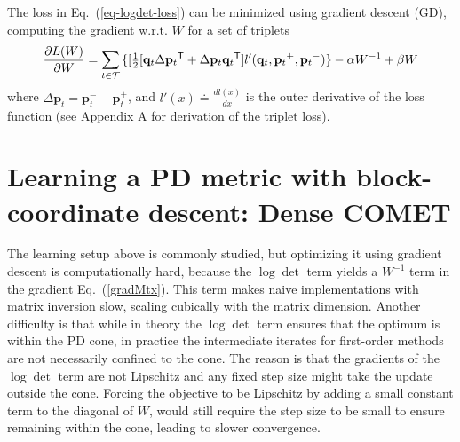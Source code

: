\documentclass[twoside,11pt]{article}
\newcommand\mat[1]{{#1}}
\renewcommand\vec[1]{\mathbf{#1}}
\newcommand{\T}{{}^\mathsf{T}}
\newcommand{\W}{\mat{W}}
\newcommand{\eqdef}{\doteq}
\newcommand{\q}{{\vec{q}}}
\newcommand{\p}{{\vec{p}}}
\newcommand{\trip}{{t}}
\newcommand{\qt}{{\q_{\trip}}}
\newcommand{\pt}{{\p_{\trip}}}
\newcommand{\triplet}{(\qt, \pt^{+}, \pt^{-})}
\renewcommand{\eqref}[1]{Eq.~(\ref{#1})}
\begin{document}
The loss in \eqref{eq-logdet-loss} can be minimized using gradient descent (GD), computing the gradient w.r.t. $\W$ for a set of triplets
\begin{equation}
  \frac{\partial {L (\W)}}{\partial \W} = \sum\limits_{t\in \cal{T}}{\{
  [\tfrac{1}{2}[\q_{t}\Delta\p_{t}\T + \Delta\p_{t}\q_{t}\T]  }
  {l'}\triplet\} - \alpha \W^{-1} + \beta \W
  \label{gradMtx}
\end{equation}
where $\Delta\p_t = \p_t^- - \p_t^+$, and $l'(x) \eqdef \frac{d{l(x)}}{dx}$ is the outer derivative of the loss function (see Appendix A for derivation of the triplet loss). 
\section{Learning a PD metric with block-coordinate descent: Dense COMET}
\label{learing_dense_comet}
\vskip -5pt
The learning setup above is commonly studied, but 
optimizing it using gradient descent is computationally hard, because the $\log \det$ term yields a $\W^{-1}$ term in the gradient \eqref{gradMtx}. This term makes naive implementations with matrix inversion slow, scaling cubically with the matrix dimension. Another difficulty is that while in theory the $\log \det$ term ensures that the optimum is within the PD cone, in practice the intermediate iterates for first-order methods are not necessarily confined to the cone. The reason is that the gradients of the $\log \det$ term are not Lipschitz and any fixed step size might take the update outside the cone. Forcing the objective to be Lipschitz by adding a small constant term to the diagonal of $\W$, would still require the step size to be small to ensure remaining within the cone, leading to slower convergence. 
\end{document}
